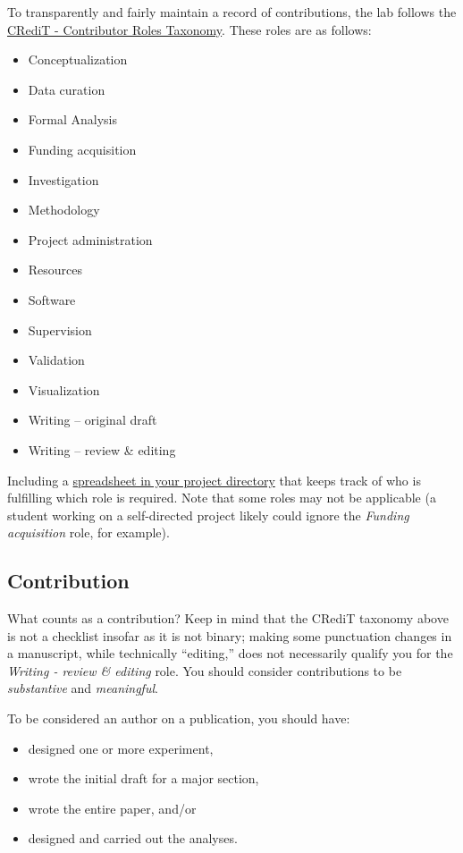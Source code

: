 \documentclass[]{tufte-book}
\providecommand{\tightlist}{%
  \setlength{\itemsep}{0pt}\setlength{\parskip}{0pt}}
\begin{document}
To transparently and fairly maintain a record of contributions, the lab follows the \href{https://casrai.org/credit/}{CRediT - Contributor Roles Taxonomy}. These roles are as follows:

\begin{itemize}
\tightlist
\item
  Conceptualization
\item
  Data curation
\item
  Formal Analysis
\item
  Funding acquisition
\item
  Investigation
\item
  Methodology
\item
  Project administration
\item
  Resources
\item
  Software
\item
  Supervision
\item
  Validation
\item
  Visualization
\item
  Writing -- original draft
\item
  Writing -- review \& editing
\end{itemize}

Including a \href{https://osf.io/wj3hb/}{spreadsheet in your project directory} that keeps track of who is fulfilling which role is required. Note that some roles may not be applicable (a student working on a self-directed project likely could ignore the \emph{Funding acquisition} role, for example).

\hypertarget{contribution}{%
\subsection{Contribution}\label{contribution}}

What counts as a contribution? Keep in mind that the CRediT taxonomy above is not a checklist insofar as it is not binary; making some punctuation changes in a manuscript, while technically ``editing,'' does not necessarily qualify you for the \emph{Writing - review \& editing} role. You should consider contributions to be \emph{substantive} and \emph{meaningful}.

To be considered an author on a publication, you should have:

\begin{itemize}
\tightlist
\item
  designed one or more experiment,
\item
  wrote the initial draft for a major section,
\item
  wrote the entire paper, and/or
\item
  designed and carried out the analyses.
\end{itemize}
\end{document}
